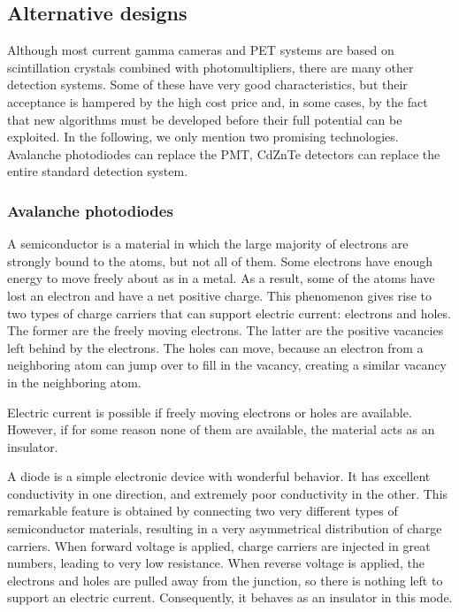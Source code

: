 \subsection{Alternative designs}
Although most current gamma cameras and PET systems are based on
scintillation crystals combined with photomultipliers, there are many
other detection systems. Some of these have very good characteristics, but
their acceptance is hampered by the high cost price and, in some cases, by
the fact that new algorithms must be developed before their full potential
can be exploited. In the following, we only mention two promising
technologies. Avalanche photodiodes can replace the PMT, CdZnTe detectors
can replace the entire standard detection system.

\subsubsection{Avalanche photodiodes}
A semiconductor is a material in which the large majority of electrons are
strongly bound to the atoms, but not all of them. Some electrons have enough
energy to move freely about as in a metal. As a result, some of the atoms
have lost an electron and have a net positive charge. This phenomenon gives
rise to two types of charge carriers that can support electric current:
electrons and holes. The former are the freely moving electrons. The latter
are the positive vacancies left behind by the electrons. The holes can move,
because an electron from a neighboring atom can jump over to fill in the
vacancy, creating a similar vacancy in the neighboring atom.

Electric current is possible if freely moving electrons or holes are
available. However, if for some reason none of them are available, the
material acts as an insulator.

A diode is a simple electronic device with wonderful behavior. It has
excellent conductivity in one direction, and extremely poor conductivity in
the other.  This remarkable feature is obtained by connecting two very
different types of semiconductor materials, resulting in a very asymmetrical
distribution of charge carriers. When forward voltage is applied, charge
carriers are injected in great numbers, leading to very low resistance. When
reverse voltage is applied, the electrons and holes are pulled away from the
junction, so there is nothing left to support an electric
current. Consequently, it behaves as an insulator in this mode.

